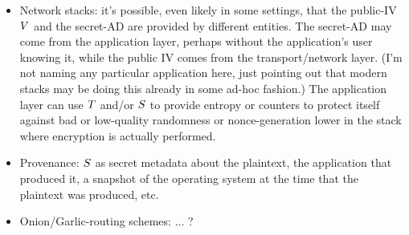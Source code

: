\begin{itemize}
%
\item Network stacks: it's possible, even likely in some settings, that the public-IV~$V$ and the secret-AD are provided by different entities.  The secret-AD may come from the application layer, perhaps without the application's user knowing it, while the public IV comes from the transport/network layer. (I'm not naming any particular application here, just pointing out that modern stacks may be doing this already in some ad-hoc fashion.)  The application layer can use $T$ and/or $S$ to provide entropy or counters to protect itself against bad or low-quality randomness or nonce-generation lower in the stack where encryption is actually performed.
%
\item Provenance: $S$ as secret metadata about the plaintext, the application that produced it, a snapshot of the operating system at the time that the plaintext was produced, etc. 
%
\item Onion/Garlic-routing schemes: ... ? 

\end{itemize}
